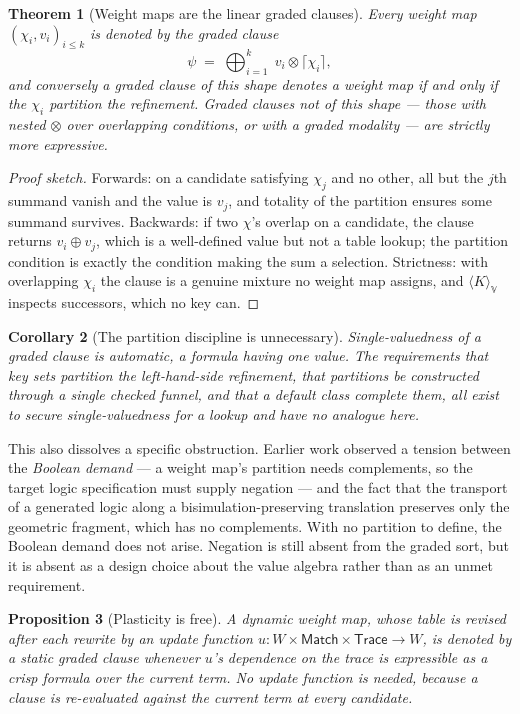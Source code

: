 \documentclass[11pt,a4paper]{article}
\theoremstyle{plain}
\newtheorem{theorem}{Theorem}[section]
\newtheorem{proposition}[theorem]{Proposition}
\newtheorem{corollary}[theorem]{Corollary}
\theoremstyle{definition}
\theoremstyle{remark}
\newcommand{\V}{\mathbb{V}}
\newcommand{\tensorv}{\otimes}
\newcommand{\sumv}{\oplus}
\newcommand{\crisp}[1]{\lceil #1 \rceil}
\begin{document}
\begin{theorem}[Weight maps are the linear graded clauses]\label{thm:dnf}
Every weight map $(\chi_i,v_i)_{i\leq k}$ is denoted by the graded clause
\[
  \psi \;=\; \bigoplus_{i=1}^{k} \; v_i \tensorv \crisp{\chi_i},
\]
and conversely a graded clause of this shape denotes a weight map if and only if
the $\chi_i$ partition the refinement. Graded clauses not of this shape ---
those with nested $\tensorv$ over overlapping conditions, or with a graded
modality --- are strictly more expressive.
\end{theorem}

\begin{proof}[Proof sketch]
Forwards: on a candidate satisfying $\chi_j$ and no other, all but the $j$th
summand vanish and the value is $v_j$, and totality of the partition ensures some
summand survives. Backwards: if two $\chi$'s overlap on a candidate, the clause
returns $v_i \sumv v_j$, which is a well-defined value but not a table lookup;
the partition condition is exactly the condition making the sum a selection.
Strictness: with overlapping $\chi_i$ the clause is a genuine mixture no weight
map assigns, and $\langle K\rangle_\V$ inspects successors, which no key can.
\end{proof}

\begin{corollary}[The partition discipline is unnecessary]\label{cor:nopartition}
Single-valuedness of a graded clause is automatic, a formula having one value.
The requirements that key sets partition the left-hand-side refinement, that
partitions be constructed through a single checked funnel, and that a default
class complete them, all exist to secure single-valuedness for a lookup and have
no analogue here.
\end{corollary}

This also dissolves a specific obstruction. Earlier work observed a tension
between the \emph{Boolean demand} --- a weight map's partition needs complements,
so the target logic specification must supply negation --- and the fact that the
transport of a generated logic along a bisimulation-preserving translation
preserves only the geometric fragment, which has no complements. With no
partition to define, the Boolean demand does not arise. Negation is still absent
from the graded sort, but it is absent as a design choice about the value algebra
rather than as an unmet requirement.

\begin{proposition}[Plasticity is free]\label{prop:plastic}
A dynamic weight map, whose table is revised after each rewrite by an update
function $u : W \times \textsf{Match} \times \textsf{Trace} \to W$, is denoted by
a static graded clause whenever $u$'s dependence on the trace is expressible as a
crisp formula over the current term. No update function is needed, because a
clause is re-evaluated against the current term at every candidate.
\end{proposition}
\end{document}
